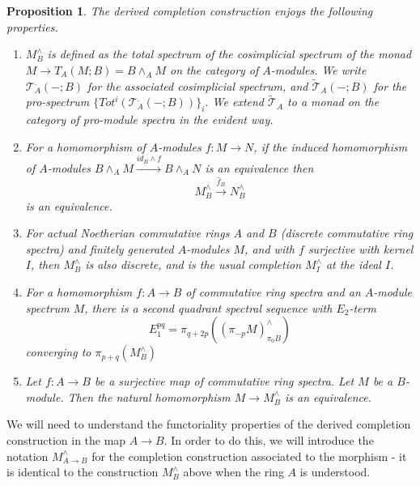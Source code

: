 \documentclass[11pt]{article}
\newcommand\mc{\mathcal}
\newtheorem{Proposition}{Proposition}[section]
\begin{document}
 \begin{Proposition} \label{properties} The derived completion construction enjoys the following properties.  
     
\begin{enumerate}[label=(\arabic*), font=\upshape] 
\item{\label{tripledefinition} $M^{\wedge} _B$ is defined as the total spectrum of the cosimplicial spectrum of the monad $M \rightarrow T_A(M;B) =   B \wedge_A M$ on the category of $A$-modules.  We write $\mc{T}_A^. (-;B)$ for the associated cosimplicial spectrum, and $\tilde{\mc{T}}_A( -;B)$ for the pro-spectrum $\{ Tot^i(\mc{T}_A^. (-;B))\}_i $. We extend $\tilde{\mc{T}}_A$ to a monad on the category of pro-module spectra in the evident way.  }
     \item{ \label{keyprop} For a homomorphism of $A$-modules $f:M \rightarrow N$, if the induced homomorphism of $A$-modules $B \wedge _A M \overset{id_B \wedge f}{\longrightarrow} B \wedge_A N$ is an equivalence then 
     $$M^{\wedge} _B \overset{\hat{f}_B}\longrightarrow N^{\wedge}_B
     $$ is an equivalence.  }
     \item{For actual Noetherian commutative rings $A$ and $B$ (discrete commutative ring spectra) and finitely generated  $A$-modules $M$, and with  $f$  surjective with kernel $I$, then $M^{\wedge} _B$ is also discrete, and is the usual completion $M^{\wedge} _I$ at the ideal $I$.   }
     \item{\label{derss}For a homomorphism $f:A \rightarrow B$ of commutative ring spectra and an $A$-module spectrum $M$, there is a second quadrant spectral sequence with $E_2$-term 
     $$ E_1^{pq} = \pi  _{q + 2p}(( \pi _{ -p}M)^{\wedge}_{\pi _0 B})
$$ converging to $\pi _{p+q}(M^{\wedge}_B)$}
\item{\label{trivialequiv}  Let $f: A \rightarrow B$ be a surjective map of commutative ring spectra. Let  $M$ be  a $B$-module.   Then the natural homomorphism  $M \rightarrow M^{\wedge}_B$ is an equivalence.  }
     \end{enumerate}
     \end{Proposition}

 
We will need to understand the functoriality properties of the derived completion construction in the map $ A \rightarrow B$.  In order to do this, we will introduce the notation $M^{\wedge}_{A \rightarrow B}$ for the completion construction associated to the morphism - it is identical to the construction $M^{\wedge}_B$ above when the ring $A$ is understood.   
\end{document}
